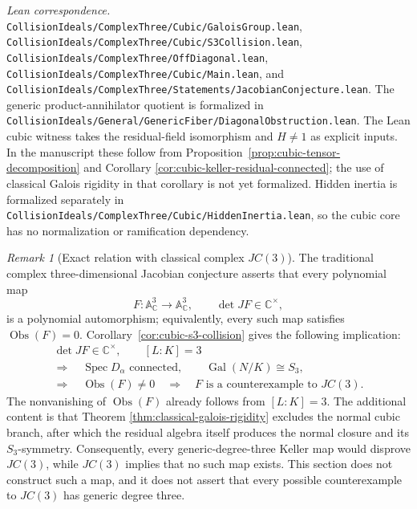 \documentclass[11pt]{article}
\theoremstyle{remark}
\newtheorem*{remark}{Remark}
\theoremstyle{definition}
\DeclareMathOperator{\Spec}{Spec}
\DeclareMathOperator{\Gal}{Gal}
\newcommand{\A}{\mathbb A}
\newcommand{\C}{\mathbb C}
\newcommand{\Obs}{\operatorname{Obs}}
\newcommand{\leanpath}[1]{\texttt{\nolinkurl{#1}}}
\newenvironment{leanfiles}
  {\par\medskip\begingroup\footnotesize\raggedright\noindent
   \textit{Lean correspondence.}\ }
  {\par\endgroup\medskip}
\begin{document}
\begin{leanfiles}
\leanpath{CollisionIdeals/ComplexThree/Cubic/GaloisGroup.lean},
\leanpath{CollisionIdeals/ComplexThree/Cubic/S3Collision.lean},
\leanpath{CollisionIdeals/ComplexThree/OffDiagonal.lean},
\leanpath{CollisionIdeals/ComplexThree/Cubic/Main.lean}, and
\leanpath{CollisionIdeals/ComplexThree/Statements/JacobianConjecture.lean}.  The
generic product-annihilator quotient is formalized in
\leanpath{CollisionIdeals/General/GenericFiber/DiagonalObstruction.lean}.  The
Lean cubic witness takes the residual-field isomorphism and
\(H\neq1\) as explicit inputs.  In the manuscript these follow from
Proposition~\ref{prop:cubic-tensor-decomposition} and Corollary
\ref{cor:cubic-keller-residual-connected}; the use of classical Galois
rigidity in that corollary is not yet formalized.  Hidden inertia is formalized
separately in
\leanpath{CollisionIdeals/ComplexThree/Cubic/HiddenInertia.lean}, so the cubic
core has no normalization or ramification dependency.
\end{leanfiles}

\begin{remark}[Exact relation with classical complex \(JC(3)\)]
\label{rem:exact-relation-jc3}
The traditional complex three-dimensional Jacobian conjecture asserts that
every polynomial map
\[
  F\colon\A^3_{\C}\longrightarrow\A^3_{\C},
  \qquad
  \det JF\in\C^\times,
\]
is a polynomial automorphism; equivalently, every such map satisfies
\(\Obs(F)=0\).  Corollary~\ref{cor:cubic-s3-collision} gives the following
implication:
\[
  \begin{gathered}
    \det JF\in\C^\times,\qquad [L:K]=3\\
    \Longrightarrow\quad
    \Spec D_\alpha\text{ connected},\qquad
    \Gal(N/K)\cong S_3,\\
    \Longrightarrow\quad \Obs(F)\neq0
    \quad\Longrightarrow\quad
    F\text{ is a counterexample to }JC(3).
  \end{gathered}
\]
The nonvanishing of \(\Obs(F)\) already follows from \([L:K]=3\).
The additional content is that Theorem
\ref{thm:classical-galois-rigidity} excludes the normal cubic branch,
after which the residual algebra itself produces the normal closure and
its \(S_3\)-symmetry.  Consequently, every generic-degree-three Keller map
would disprove \(JC(3)\), while \(JC(3)\) implies that no such map exists.
This section does not construct such a map, and it does not assert that
every possible counterexample to \(JC(3)\) has generic degree three.
\end{remark}
\end{document}
